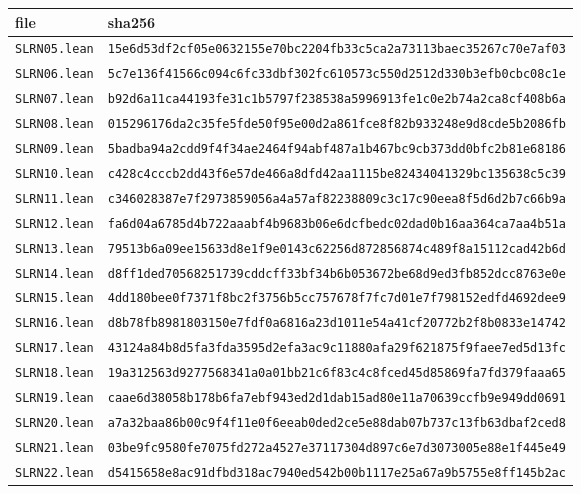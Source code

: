 \begin{center}\scriptsize\begin{tabular}{ll}\toprule
file & sha256\\\midrule
\texttt{SLRN05.lean} & \texttt{15e6d53df2cf05e0632155e70bc2204fb33c5ca2a73113baec35267c70e7af03}\\
\texttt{SLRN06.lean} & \texttt{5c7e136f41566c094c6fc33dbf302fc610573c550d2512d330b3efb0cbc08c1e}\\
\texttt{SLRN07.lean} & \texttt{b92d6a11ca44193fe31c1b5797f238538a5996913fe1c0e2b74a2ca8cf408b6a}\\
\texttt{SLRN08.lean} & \texttt{015296176da2c35fe5fde50f95e00d2a861fce8f82b933248e9d8cde5b2086fb}\\
\texttt{SLRN09.lean} & \texttt{5badba94a2cdd9f4f34ae2464f94abf487a1b467bc9cb373dd0bfc2b81e68186}\\
\texttt{SLRN10.lean} & \texttt{c428c4cccb2dd43f6e57de466a8dfd42aa1115be82434041329bc135638c5c39}\\
\texttt{SLRN11.lean} & \texttt{c346028387e7f2973859056a4a57af82238809c3c17c90eea8f5d6d2b7c66b9a}\\
\texttt{SLRN12.lean} & \texttt{fa6d04a6785d4b722aaabf4b9683b06e6dcfbedc02dad0b16aa364ca7aa4b51a}\\
\texttt{SLRN13.lean} & \texttt{79513b6a09ee15633d8e1f9e0143c62256d872856874c489f8a15112cad42b6d}\\
\texttt{SLRN14.lean} & \texttt{d8ff1ded70568251739cddcff33bf34b6b053672be68d9ed3fb852dcc8763e0e}\\
\texttt{SLRN15.lean} & \texttt{4dd180bee0f7371f8bc2f3756b5cc757678f7fc7d01e7f798152edfd4692dee9}\\
\texttt{SLRN16.lean} & \texttt{d8b78fb8981803150e7fdf0a6816a23d1011e54a41cf20772b2f8b0833e14742}\\
\texttt{SLRN17.lean} & \texttt{43124a84b8d5fa3fda3595d2efa3ac9c11880afa29f621875f9faee7ed5d13fc}\\
\texttt{SLRN18.lean} & \texttt{19a312563d9277568341a0a01bb21c6f83c4c8fced45d85869fa7fd379faaa65}\\
\texttt{SLRN19.lean} & \texttt{caae6d38058b178b6fa7ebf943ed2d1dab15ad80e11a70639ccfb9e949dd0691}\\
\texttt{SLRN20.lean} & \texttt{a7a32baa86b00c9f4f11e0f6eeab0ded2ce5e88dab07b737c13fb63dbaf2ced8}\\
\texttt{SLRN21.lean} & \texttt{03be9fc9580fe7075fd272a4527e37117304d897c6e7d3073005e88e1f445e49}\\
\texttt{SLRN22.lean} & \texttt{d5415658e8ac91dfbd318ac7940ed542b00b1117e25a67a9b5755e8ff145b2ac}\\

\end{tabular}
\end{center}
